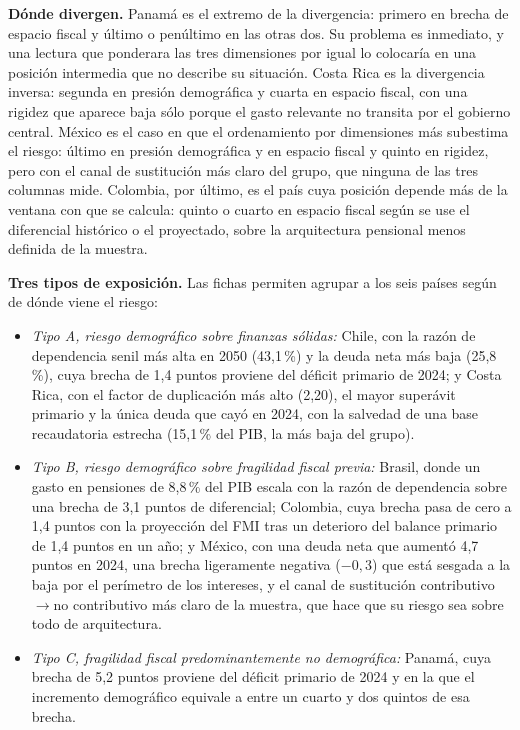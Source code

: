 \documentclass[12pt, letterpaper]{article}
\begin{document}
\textbf{Dónde divergen.} Panamá es el extremo de la divergencia: primero en brecha
de espacio fiscal y último o penúltimo en las otras dos. Su problema es inmediato,
y una lectura que ponderara las tres
dimensiones por igual lo colocaría en una posición intermedia que no describe su
situación. Costa Rica es la divergencia inversa: segunda en presión demográfica y
cuarta en espacio fiscal, con una rigidez que aparece baja sólo porque el gasto
relevante no transita por el gobierno central. México es el caso en que el
ordenamiento por dimensiones más subestima el riesgo: último en presión
demográfica y en espacio fiscal y quinto en rigidez, pero con el canal de sustitución más claro del
grupo, que ninguna de las tres columnas mide. Colombia, por último, es el país cuya
posición depende más de la ventana con que se calcula: quinto o cuarto en espacio
fiscal según se use el diferencial histórico o el proyectado, sobre la arquitectura
pensional menos definida de la muestra.

\textbf{Tres tipos de exposición.} Las fichas permiten agrupar a los seis países
según de dónde viene el riesgo:
\begin{itemize}
  \item \emph{Tipo A, riesgo demográfico sobre finanzas sólidas:} Chile, con la
  razón de dependencia senil más alta en 2050 (43,1\,\%) y la deuda neta más baja
  (25,8\,\%), cuya brecha de 1,4 puntos proviene del déficit primario de 2024; y
  Costa Rica, con el factor de duplicación más alto
  (2,20), el mayor superávit primario y la única deuda que cayó en 2024, con la
  salvedad de una base recaudatoria estrecha (15,1\,\% del PIB, la más baja del
  grupo).
  \item \emph{Tipo B, riesgo demográfico sobre fragilidad fiscal previa:} Brasil,
  donde un gasto en pensiones de 8,8\,\% del PIB escala con la razón de dependencia
  sobre una brecha de 3,1 puntos de diferencial; Colombia, cuya brecha pasa de cero
  a 1,4 puntos con la proyección del FMI tras un deterioro del balance primario de
  1,4 puntos en un año; y México, con una deuda neta que aumentó 4,7 puntos en
  2024, una brecha ligeramente negativa ($-0{,}3$) que está sesgada a la baja por
  el perímetro de los intereses, y el canal de sustitución
  contributivo$\rightarrow$no contributivo más claro de la muestra, que hace que su
  riesgo sea sobre todo de arquitectura.
  \item \emph{Tipo C, fragilidad fiscal predominantemente no demográfica:} Panamá,
  cuya brecha de 5,2 puntos proviene del déficit primario de 2024 y en la que el
  incremento demográfico equivale a entre un cuarto y dos quintos de esa brecha.
\end{itemize}
\end{document}
